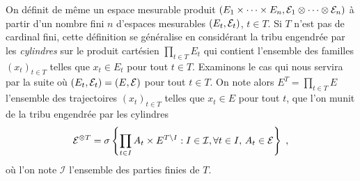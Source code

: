 On d\'efinit de m\^{e}me un espace mesurable produit $(E_1\times\dots\times E_n,\mathcal{E}_1\otimes\dots\otimes\mathcal{E}_n)$
\`a partir d'un nombre fini $n$ d'espaces mesurables $(E_t,\mathcal{E}_t)$,
$t\in T$. Si $T$ n'est pas de cardinal fini, cette d\'efinition se g\'en\'eralise en consid\'erant
 la tribu engendr\'ee par les \emph{cylindres} sur le produit cart\'esien $\prod_{t\in T} E_t$ qui contient l'ensemble des
 familles $(x_t)_{t\in T}$ telles que $x_t\in E_t$ pour tout $t\in T$. Examinons le cas qui nous servira par la suite o\`u
$(E_t,\mathcal{E}_t)=(E,\mathcal{E})$ pour tout $t\in T$. On note alors $E^T=\prod_{t\in T} E$ l'ensemble des trajectoires $(x_t)_{t\in T}$
telles que $x_t\in E$ pour tout $t$, que l'on munit de la tribu engendr\'ee par les cylindres
$$
\mathcal{E}^{\otimes T}=\sigma\left\{\prod_{t\in I}A_{t}\times E^{T\setminus I} : I\in\mathcal{I},\forall t\in I,\,A_t\in\mathcal{E}\right\}\;,
$$
o\`u l'on note $\mathcal{I}$ l'ensemble des parties finies de $T$.



